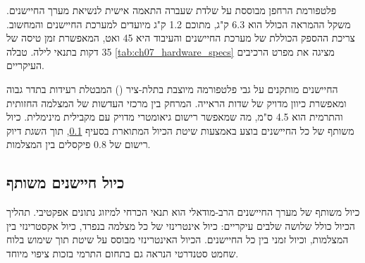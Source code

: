 פלטפורמת הרחפן מבוססת על שלדת  שעברה התאמה אישית לנשיאת מערך החיישנים. משקל ההמראה הכולל הוא 6.3 ק"ג, מתוכם 1.2 ק"ג מיועדים למערכת החיישנים והמחשוב. צריכת ההספק הכוללת של מערכת החיישנים והעיבוד היא 45 ואט, המאפשרת זמן טיסה של 35 דקות בתנאי לילה. טבלה \ref{tab:ch07_hardware_specs} מציגה את מפרט הרכיבים העיקריים.

\begin{table}[htbp]
\centering
\caption{מפרט רכיבי החומרה העיקריים של מערכת .}
\label{tab:ch07_hardware_specs}
\end{table}

החיישנים מותקנים על גבי פלטפורמה מיוצבת בתלת-ציר () המבטלת רעידות בתדר גבוה ומאפשרת כיוון מדויק של שדות הראייה. המרחק בין מרכזי העדשות של המצלמה החזותית והתרמית הוא 4.5 ס"מ, מה שמאפשר רישום גיאומטרי מדויק עם מקבילית מינימלית. כיול משותף של כל החיישנים בוצע באמצעות שיטת הכיול המתוארת בסעיף \ref{sec:ch07_calibration}, תוך השגת דיוק רישום של 0.8 פיקסלים בין המצלמות.

\subsection{כיול חיישנים משותף}
\label{sec:ch07_calibration}

כיול משותף של מערך החיישנים הרב-מודאלי הוא תנאי הכרחי למיזוג נתונים אפקטיבי. תהליך הכיול כולל שלושה שלבים עיקריים: כיול אינטרינזי של כל מצלמה בנפרד, כיול אקסטרינזי בין המצלמות, וכיול זמני בין כל החיישנים. הכיול האינטרינזי מבוסס על שיטת  תוך שימוש בלוח שחמט סטנדרטי הנראה גם בתחום התרמי בזכות ציפוי מיוחד.

